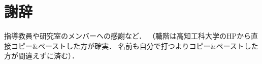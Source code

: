 \chapter*{謝辞}

指導教員や研究室のメンバーへの感謝など．
（職階は高知工科大学のHPから直接コピー{\&}ペーストした方が確実．
名前も自分で打つよりコピー{\&}ペーストした方が間違えずに済む）．
